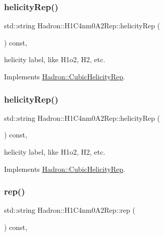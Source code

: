 \subsubsection{\texorpdfstring{helicityRep()}{helicityRep()}\hspace{0.1cm}{\footnotesize\ttfamily [2/3]}}
{\footnotesize\ttfamily std\+::string Hadron\+::\+H1\+C4nm0\+A2\+Rep\+::helicity\+Rep (\begin{DoxyParamCaption}{ }\end{DoxyParamCaption}) const\hspace{0.3cm}{\ttfamily [inline]}, {\ttfamily [virtual]}}

helicity label, like H1o2, H2, etc. 

Implements \mbox{\hyperlink{structHadron_1_1CubicHelicityRep_af1096946b7470edf0a55451cc662f231}{Hadron\+::\+Cubic\+Helicity\+Rep}}.

\mbox{\label{structHadron_1_1H1C4nm0A2Rep_a4f5f743a470752f526a30b7db1ba0f21}} 
\subsubsection{\texorpdfstring{helicityRep()}{helicityRep()}\hspace{0.1cm}{\footnotesize\ttfamily [3/3]}}
{\footnotesize\ttfamily std\+::string Hadron\+::\+H1\+C4nm0\+A2\+Rep\+::helicity\+Rep (\begin{DoxyParamCaption}{ }\end{DoxyParamCaption}) const\hspace{0.3cm}{\ttfamily [inline]}, {\ttfamily [virtual]}}

helicity label, like H1o2, H2, etc. 

Implements \mbox{\hyperlink{structHadron_1_1CubicHelicityRep_af1096946b7470edf0a55451cc662f231}{Hadron\+::\+Cubic\+Helicity\+Rep}}.

\mbox{\label{structHadron_1_1H1C4nm0A2Rep_aa814381161d711ca3fb036897c27ec86}} 
\subsubsection{\texorpdfstring{rep()}{rep()}\hspace{0.1cm}{\footnotesize\ttfamily [1/5]}}
{\footnotesize\ttfamily std\+::string Hadron\+::\+H1\+C4nm0\+A2\+Rep\+::rep (\begin{DoxyParamCaption}{ }\end{DoxyParamCaption}) const\hspace{0.3cm}{\ttfamily [inline]}, {\ttfamily [virtual]}}



